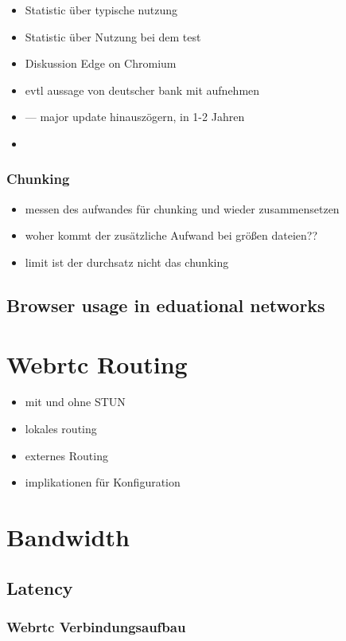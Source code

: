 \begin{itemize}
	\item Statistic über typische nutzung
	\item Statistic über Nutzung bei dem test
	\item Diskussion Edge on Chromium
	\item evtl aussage von deutscher bank mit aufnehmen
	\item  --- major update hinauszögern, in 1-2 Jahren
	\item 
\end{itemize}

\subsubsection{Chunking}
\begin{itemize}
	\item messen des aufwandes für chunking und wieder zusammensetzen
	\item woher kommt der zusätzliche Aufwand bei größen dateien??
	\item limit ist der durchsatz nicht das chunking
\end{itemize}

\subsection{Browser usage in eduational networks}

\section{Webrtc Routing}
\begin{itemize}
	\item mit und ohne STUN
	\item lokales routing
	\item externes Routing
	\item implikationen für Konfiguration
\end{itemize}
\section{Bandwidth}

\subsection{Latency}

\subsubsection{Webrtc Verbindungsaufbau}

